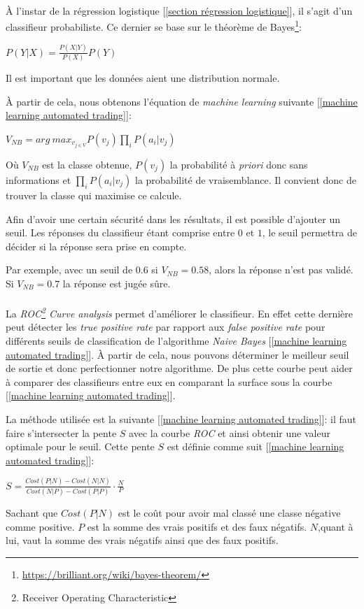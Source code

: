 \documentclass[a4paper, 11pt]{article}
\begin{document}
\paragraph{}
À l'instar de la régression logistique [\ref{section régression logistique}], il s'agit d'un classifieur probabiliste. Ce dernier se base sur le théorème de Bayes\footnote{\url{https://brilliant.org/wiki/bayes-theorem/}}:
\begin{center}
$P(Y|X) = \frac{P(X|Y)}{P(X)}P(Y)$
\end{center}
Il est important que les données aient une distribution normale.

À partir de cela, nous obtenons l'équation de \textit{machine learning} suivante [\ref{machine learning automated trading}]:
\begin{center}
$V_{NB} = arg\ max_{v_{j \in V}} P(v_j) \prod\limits_i P(a_i | v_j)$
\end{center}
Où $V_{NB}$ est la classe obtenue, $P(v_j)$ la probabilité à \textit{priori} donc sans informations et $\prod\limits_i P(a_i | v_j)$ la probabilité de vraisemblance.
Il convient donc de trouver la classe qui maximise ce calcule.

Afin d'avoir une certain sécurité dans les résultats, il est possible d'ajouter un seuil. Les réponses du classifieur étant comprise entre $0$ et $1$, le seuil permettra de décider si la réponse sera prise en compte.

Par exemple, avec un seuil de $0.6$ si $V_{NB} = 0.58$, alors la réponse n'est pas validé. Si $V_{NB} = 0.7$ la réponse est jugée sûre. 

\paragraph{}
La \textit{ROC\footnote{Receiver Operating Characteristic} Curve analysis} permet d'améliorer le classifieur. En effet cette dernière peut détecter les \textit{true positive rate} par rapport aux \textit{false positive rate} pour différents seuils de classification de l'algorithme \textit{Naive Bayes} [\ref{machine learning automated trading}]. À partir de cela, nous pouvons déterminer le meilleur seuil de sortie et donc perfectionner notre algorithme.
De plus cette courbe peut aider à comparer des classifieurs entre eux en comparant la surface sous la courbe [\ref{machine learning automated trading}].

La méthode utilisée est la suivante [\ref{machine learning automated trading}]: il faut faire s'intersecter la pente $S$ avec la courbe \textit{ROC} et ainsi obtenir une valeur optimale pour le seuil.
Cette pente $S$ est définie comme suit [\ref{machine learning automated trading}]:
\begin{center}
$S = \frac{Cost(P|N) - Cost(N|N)}{Cost(N|P) - Cost(P|P)} \cdot \frac{N}{P}$
\end{center}
Sachant que $Cost(P|N)$ est le coût pour avoir mal classé une classe négative comme positive. $P$ est la somme des vrais positifs et des faux négatifs. $N$,quant à lui, vaut la somme des vrais négatifs ainsi que des faux positifs.
\end{document}

